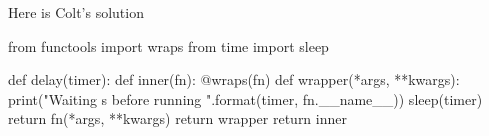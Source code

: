 Here is Colt's solution
\begin{listing}{1}
from functools import wraps
from time import sleep
    
def delay(timer):
    def inner(fn):
        @wraps(fn)
        def wrapper(*args, **kwargs):
            print("Waiting {}s before running {}".format(timer, fn.__name__))
            sleep(timer)
            return fn(*args, **kwargs)
        return wrapper
    return inner    
\end{listing}